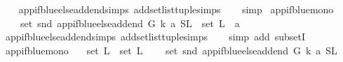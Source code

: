 \begin{isabellebody}
%
\isadelimproof
\ \ %
\endisadelimproof
%
\isatagproof
{}\isamarkupfalse%
\ app{\isacharunderscore}{\kern0pt}if{\isacharunderscore}{\kern0pt}blue{\isacharunderscore}{\kern0pt}else{\isacharunderscore}{\kern0pt}add{\isacharunderscore}{\kern0pt}end{\isachardot}{\kern0pt}simps\ add{\isacharunderscore}{\kern0pt}set{\isacharunderscore}{\kern0pt}list{\isacharunderscore}{\kern0pt}tuple{\isachardot}{\kern0pt}simps\isanewline
\ \ \isamarkupfalse%
\ simp%
\endisatagproof
{\isafoldproof}%
%
\isadelimproof
\isanewline
%
\endisadelimproof
\isanewline
{}\isamarkupfalse%
\ app{\isacharunderscore}{\kern0pt}if{\isacharunderscore}{\kern0pt}blue{\isacharunderscore}{\kern0pt}mono{}{\isacharcolon}{\kern0pt}\isanewline
\ \ \ \ {\isachardoublequoteopen}set\ {\isacharparenleft}{\kern0pt}snd\ {\isacharparenleft}{\kern0pt}app{\isacharunderscore}{\kern0pt}if{\isacharunderscore}{\kern0pt}blue{\isacharunderscore}{\kern0pt}else{\isacharunderscore}{\kern0pt}add{\isacharunderscore}{\kern0pt}end\ G\ k\ a\ {\isacharparenleft}{\kern0pt}S{\isacharcomma}{\kern0pt}L{\isacharparenright}{\kern0pt}{\isacharparenright}{\kern0pt}{\isacharparenright}{\kern0pt}\ {\isasymsubseteq}\ set\ L\ {\isasymunion}\ {\isacharbraceleft}{\kern0pt}a{\isacharbraceright}{\kern0pt}{\isachardoublequoteclose}\isanewline
%
\isadelimproof
\ \ %
\endisadelimproof
%
\isatagproof
{}\isamarkupfalse%
\ app{\isacharunderscore}{\kern0pt}if{\isacharunderscore}{\kern0pt}blue{\isacharunderscore}{\kern0pt}else{\isacharunderscore}{\kern0pt}add{\isacharunderscore}{\kern0pt}end{\isachardot}{\kern0pt}simps\ add{\isacharunderscore}{\kern0pt}set{\isacharunderscore}{\kern0pt}list{\isacharunderscore}{\kern0pt}tuple{\isachardot}{\kern0pt}simps\isanewline
\ \ \isamarkupfalse%
\ {\isacharparenleft}{\kern0pt}simp\ add{\isacharcolon}{\kern0pt}\ subsetI{\isacharparenright}{\kern0pt}%
\endisatagproof
{\isafoldproof}%
%
\isadelimproof
\isanewline
%
\endisadelimproof
\isanewline
{}\isamarkupfalse%
\ app{\isacharunderscore}{\kern0pt}if{\isacharunderscore}{\kern0pt}blue{\isacharunderscore}{\kern0pt}mono{}{\isacharcolon}{\kern0pt}\isanewline
\ \ \ {\isachardoublequoteopen}set\ L{}\ {\isasymsubseteq}\ set\ L{}{\isachardoublequoteclose}\isanewline
\ \ \ \ {\isachardoublequoteopen}set\ {\isacharparenleft}{\kern0pt}snd\ {\isacharparenleft}{\kern0pt}app{\isacharunderscore}{\kern0pt}if{\isacharunderscore}{\kern0pt}blue{\isacharunderscore}{\kern0pt}else{\isacharunderscore}{\kern0pt}add{\isacharunderscore}{\kern0pt}end\ G\ k\ a\ {\isacharparenleft}{\kern0pt}S{\isacharcomma}{\kern0pt}L{}{\isacharparenright}{\kern0pt}{\isacharparenright}{\kern0pt}{\isacharparenright}{\kern0pt}\isanewline

\end{isabellebody}
